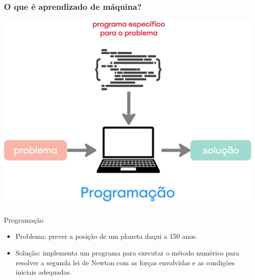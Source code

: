 \begin{frame}
    \frametitle{O que é aprendizado de máquina?}
    \begin{center}
        \includegraphics[height=0.4\paperheight]{./imgs/fig3-programacao.jpg}
    \end{center}
    \begin{block}{Programação}
        \begin{itemize}
            \item Problema: prever a posição de um planeta daqui a 150 anos.
            \item Solução: implementa um programa para executar o método numérico para resolver a segunda lei de Newton com as forças envolvidas e as condições iniciais adequadas.
        \end{itemize}            
    \end{block}
\end{frame}

